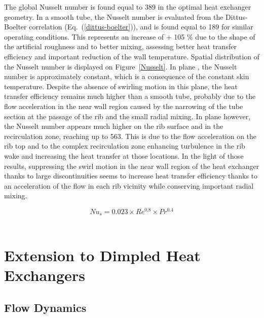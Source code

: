 The global Nusselt number is found equal to 389 in the optimal heat exchanger geometry. In a smooth tube, the Nusselt number is evaluated from the Dittus-Boelter correlation \cite{DittusBoelter1930} (Eq.~(\ref{dittus-boelter})), and is found equal to 189 for similar operating conditions. This represents an increase of + 105 \% due to the shape of the artificial roughness and to better mixing, assessing better heat transfer efficiency and important reduction of the wall temperature. Spatial distribution of the Nusselt number is displayed on Figure~\ref{Nusselt}. In plane , the Nusselt number is approximately constant, which is a consequence of the constant skin temperature. Despite the absence of swirling motion in this plane, the heat transfer efficiency remains much higher than a smooth tube, probably due to the flow acceleration in the near wall region caused by the narrowing of the tube section at the passage of the rib and the small radial mixing. In plane  however, the Nusselt number appears much higher on the rib surface and in the recirculation zone, reaching up to 563. This is due to the flow acceleration on the rib top and to the complex recirculation zone enhancing turbulence in the rib wake and increasing the heat transfer at those locations. In the light of those results, suppressing the swirl motion in the near wall region of the heat exchanger thanks to large discontinuities seems to increase heat transfer efficiency thanks to an acceleration of the flow in each rib vicinity while conserving important radial mixing.

\begin{equation}
Nu_s = 0.023 \times Re^{0.8} \times Pr^{0.4}
\label{dittus-boelter}
\end{equation}\\

\section{Extension to Dimpled Heat Exchangers}
\label{sec:optim_discussion}

\subsection{Flow Dynamics}
\label{sec:transition_shape}

